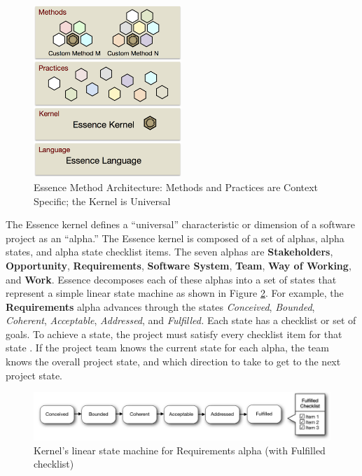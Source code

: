 \documentclass[preprint,12pt,3p]{elsarticle}
\begin{document}
\begin{figure}[h]\vspace*{4pt}
\centerline{\includegraphics[width=2.2in]{kernel_images/EssenceLayers}}
\caption{Essence Method Architecture: Methods and Practices are Context Specific; the Kernel is Universal}\vspace*{-6pt}\label{EssenceLayers}
\end{figure}

The Essence kernel defines a ``universal'' characteristic or dimension of a software project as an ``alpha.'' The Essence kernel is composed of a set of alphas, alpha states, and alpha state checklist items. The seven alphas are \textbf{Stakeholders}, \textbf{Opportunity}, \textbf{Requirements}, \textbf{Software System}, \textbf{Team}, \textbf{Way of Working}, and \textbf{Work}. Essence decomposes each of these alphas into a set of states that represent a simple linear state machine as shown in Figure \ref{StateMachine}. For example, the \textbf{Requirements} alpha advances through the states \textit{Conceived}, \textit{Bounded}, \textit{Coherent}, \textit{Acceptable}, \textit{Addressed}, and \textit{Fulfilled.} Each state has a checklist or set of goals. To achieve a state, the project must satisfy every checklist item for that state \cite{OMGStandard}. If the project team knows the current state for each alpha, the team knows the overall project state, and which direction to take to get to the next project state.
 
\begin{figure}[h]\vspace*{4pt}
\centerline{\includegraphics[width=5.4in]{kernel_images/StateMachineRequirements}}
\caption{Kernel's linear state machine for Requirements alpha (with Fulfilled checklist)}\vspace*{-6pt}\label{StateMachine}
\end{figure}
\end{document}
